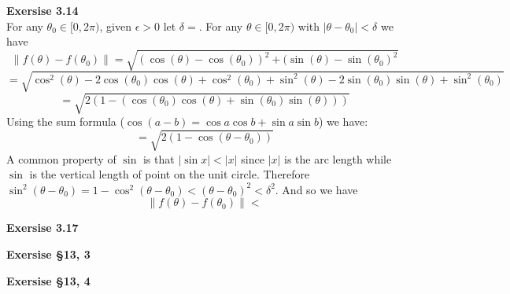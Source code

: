 \documentclass[12pt]{article}
\newenvironment{ques}[1]{\textbf{Exersise #1}\vspace{1 mm}\\ }{\bigskip}
\theoremstyle{definition}
\begin{document}
\begin{ques}{3.14}
	For any $\theta_0 \in [0,2\pi)$, given $\epsilon > 0$ let $\delta = $.
	For any $\theta \in [0,2\pi)$ with $|\theta - \theta_0| < \delta$ we
	have 
	$$\lVert f(\theta) - f(\theta_0) \rVert = \sqrt{(\cos(\theta) -
	\cos(\theta_0))^2 + (\sin(\theta) - \sin(\theta_0)^2}$$
	$$= \sqrt{\cos^2(\theta) - 2\cos(\theta_0)\cos(\theta) +
	\cos^2(\theta_0) +\sin^2(\theta) - 2\sin(\theta_0)\sin(\theta) +
	\sin^2(\theta_0)}$$
	$$= \sqrt{2(1 - (\cos(\theta_0)\cos(\theta) + \sin(\theta_0)\sin(\theta)))}$$
	Using the sum formula ($\cos(a - b) = \cos a\cos b + \sin a \sin b$) we have:
	$$= \sqrt{2(1 - \cos(\theta - \theta_0))}$$
	A common property of $\sin$ is that $|\sin x| < |x|$ since $|x|$ is the arc
	length while $\sin$ is the vertical length of point on the unit circle.
	Therefore $\sin^2 (\theta - \theta_0) = 1 - \cos^2 (\theta - \theta_0)
	< (\theta - \theta_0)^2 < \delta^2$. And so we have
	$$\lVert f(\theta) - f(\theta_0) \rVert < $$ 
	
\end{ques}

\begin{ques}{3.17}
\end{ques}

\begin{ques}{\S 13, 3}
\end{ques}

\begin{ques}{\S 13, 4}
\end{ques}
\end{document}
